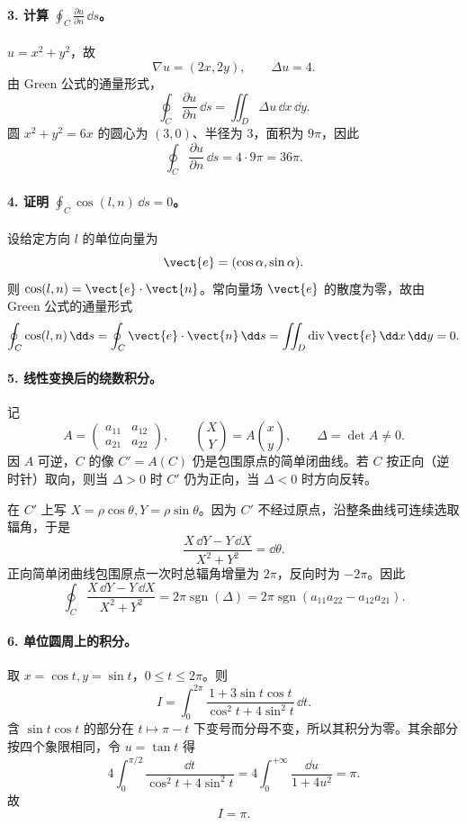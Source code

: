 \paragraph{3. 计算 $\displaystyle\oint_C\frac{\partial u}{\partial n}\,\dd s$。}
\begin{xsolution}
$u=x^2+y^2$，故
\[
  \nabla u=(2x,2y),\qquad \Delta u=4.
\]
由 Green 公式的通量形式，
\[
  \oint_C\frac{\partial u}{\partial n}\,\dd s
  =\iint_D\Delta u\,\dd x\,\dd y.
\]
圆 $x^2+y^2=6x$ 的圆心为 $(3,0)$、半径为 $3$，面积为 $9\pi$，因此
\[
  \oint_C\frac{\partial u}{\partial n}\,\dd s
  =4\cdot9\pi=36\pi.
\]
\end{xsolution}

\paragraph{4. 证明 $\displaystyle\oint_C\cos(l,n)\,\dd s=0$。}
\begin{xsolution}
设给定方向 $l$ 的单位向量为
\[
  \vect{e}=(\cos\alpha,\sin\alpha).
\]
则 $\cos(l,n)=\vect{e}\cdot\vect{n}$。常向量场 $\vect{e}$ 的散度为零，故由 Green 公式的通量形式
\[
  \oint_C\cos(l,n)\,\dd s
  =\oint_C\vect{e}\cdot\vect{n}\,\dd s
  =\iint_D\operatorname{div}\vect{e}\,\dd x\,\dd y=0.
\]
\end{xsolution}

\paragraph{5. 线性变换后的绕数积分。}
\begin{xsolution}
记
\[
  A=\begin{pmatrix}a_{11}&a_{12}\\a_{21}&a_{22}\end{pmatrix},
  \qquad
  \binom XY=A\binom xy,
  \qquad \Delta=\det A\ne0.
\]
因 $A$ 可逆，$C$ 的像 $C'=A(C)$ 仍是包围原点的简单闭曲线。若 $C$ 按正向（逆时针）取向，则当 $\Delta>0$ 时 $C'$ 仍为正向，当 $\Delta<0$ 时方向反转。

在 $C'$ 上写 $X=\rho\cos\theta,Y=\rho\sin\theta$。因为 $C'$ 不经过原点，沿整条曲线可连续选取辐角，于是
\[
  \frac{X\,\dd Y-Y\,\dd X}{X^2+Y^2}=\dd\theta.
\]
正向简单闭曲线包围原点一次时总辐角增量为 $2\pi$，反向时为 $-2\pi$。因此
\[
  \oint_C\frac{X\,\dd Y-Y\,\dd X}{X^2+Y^2}
  =2\pi\operatorname{sgn}(\Delta)
  =2\pi\operatorname{sgn}(a_{11}a_{22}-a_{12}a_{21}).
\]
\end{xsolution}

\paragraph{6. 单位圆周上的积分。}
\begin{xsolution}
取 $x=\cos t,y=\sin t$，$0\le t\le2\pi$。则
\[
  I=\int_0^{2\pi}
  \frac{1+3\sin t\cos t}{\cos^2t+4\sin^2t}\,\dd t.
\]
含 $\sin t\cos t$ 的部分在 $t\mapsto\pi-t$ 下变号而分母不变，所以其积分为零。其余部分按四个象限相同，令 $u=\tan t$ 得
\[
  4\int_0^{\pi/2}\frac{\dd t}{\cos^2t+4\sin^2t}
  =4\int_0^{+\infty}\frac{\dd u}{1+4u^2}
  =\pi.
\]
故
\[
  I=\pi.
\]
\end{xsolution}

